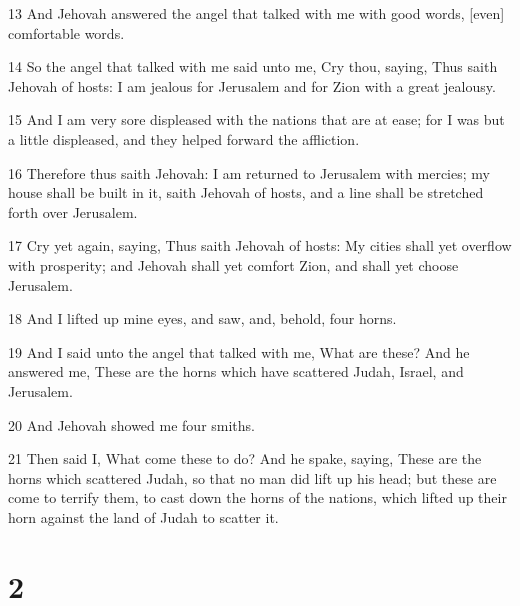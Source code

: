 \par 13 And Jehovah answered the angel that talked with me with good words, [even] comfortable words.
\par 14 So the angel that talked with me said unto me, Cry thou, saying, Thus saith Jehovah of hosts: I am jealous for Jerusalem and for Zion with a great jealousy.
\par 15 And I am very sore displeased with the nations that are at ease; for I was but a little displeased, and they helped forward the affliction.
\par 16 Therefore thus saith Jehovah: I am returned to Jerusalem with mercies; my house shall be built in it, saith Jehovah of hosts, and a line shall be stretched forth over Jerusalem.
\par 17 Cry yet again, saying, Thus saith Jehovah of hosts: My cities shall yet overflow with prosperity; and Jehovah shall yet comfort Zion, and shall yet choose Jerusalem.
\par 18 And I lifted up mine eyes, and saw, and, behold, four horns.
\par 19 And I said unto the angel that talked with me, What are these? And he answered me, These are the horns which have scattered Judah, Israel, and Jerusalem.
\par 20 And Jehovah showed me four smiths.
\par 21 Then said I, What come these to do? And he spake, saying, These are the horns which scattered Judah, so that no man did lift up his head; but these are come to terrify them, to cast down the horns of the nations, which lifted up their horn against the land of Judah to scatter it.

\chapter{2}

